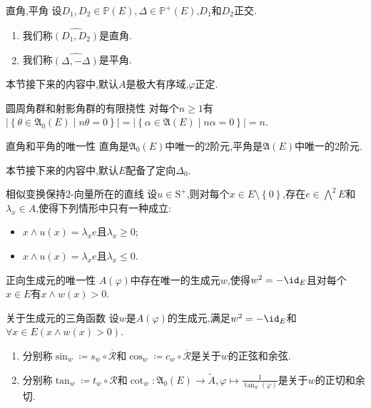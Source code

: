 \begin{definition}{直角,平角}{}
	设$D_{1},D_{2}\in\mathbb{P}\left(E\right),\Delta\in\mathbb{P}^{+}\left(E\right)$,$D_{1}$和$D_{2}$正交.
	\begin{enumerate}
		\item 我们称$\widehat{\left(D_{1},D_{2}\right)}$是直角.
		\item 我们称$\widehat{\left(\Delta,-\Delta\right)}$是平角.
	\end{enumerate}
\end{definition}

本节接下来的内容中,默认$A$是极大有序域,$\varphi$正定.

\begin{proposition}{圆周角群和射影角群的有限挠性}{}
	对每个$n\geq 1$有$\left|\left\{\theta\in\mathfrak{A}_{0}\left(E\right)\middle|n\theta=0\right\}\right|=\left|\left\{\alpha\in\mathfrak{A}\left(E\right)\middle|n\alpha=0\right\}\right|=n$.
\end{proposition}

\begin{corollary}{直角和平角的唯一性}{}
	直角是$\mathfrak{A}_{0}\left(E\right)$中唯一的$2$阶元,平角是$\mathfrak{A}\left(E\right)$中唯一的$2$阶元.
\end{corollary}

本节接下来的内容中,默认$E$配备了定向$\Delta_{0}$.

\begin{lemma}{相似变换保持$2$-向量所在的直线}{}
	设$u\in\mathrm{S}^{+}$,则对每个$x\in E\setminus\left\{0\right\}$,存在$e\in\bigwedge\limits^{2}E$和$\lambda_{x}\in A$,使得下列情形中只有一种成立:
	\begin{itemize}
		\item $x\wedge u\left(x\right)=\lambda_{x}e$且$\lambda_{x}\geq 0$;
		\item $x\wedge u\left(x\right)=\lambda_{x}e$且$\lambda_{x}\leq 0$.
	\end{itemize}
\end{lemma}

\begin{lemma}{正向生成元的唯一性}{}
	$A\left(\varphi\right)$中存在唯一的生成元$w$,使得$w^{2}=-\id_{E}$且对每个$x\in E$有$x\wedge w\left(x\right)>0$.
\end{lemma}

\begin{definition}{关于生成元的三角函数}{}
	设$w$是$A\left(\varphi\right)$的生成元,满足$w^{2}=-\id_{E}$和$\forall x\in E\left(x\wedge w\left(x\right)>0\right)$.
	\begin{enumerate}
		\item 分别称$\sin_{w}\coloneq s_{w}\circ\overline{\mathcal{R}}$和$\cos_{w}\coloneq c_{w}\circ\overline{\mathcal{R}}$是关于$w$的正弦和余弦.
		\item 分别称$\tan_{w}\coloneq t_{w}\circ\mathcal{R}$和$\cot_{w}:\mathfrak{A}_{0}\left(E\right)\to\tilde{A},\varphi\mapsto\frac{1}{\tan_{w}\left(\varphi\right)}$是关于$w$的正切和余切.
	\end{enumerate}
\end{definition}

